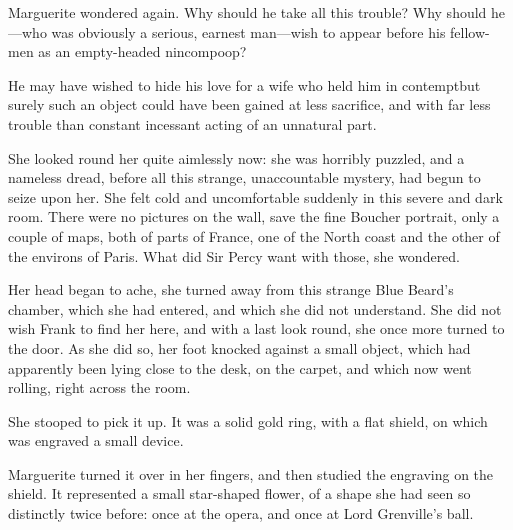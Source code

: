 Marguerite wondered again. Why should he take all this trouble? Why should he—who was obviously a serious, earnest man—wish to appear before his fellow-men as an empty-headed nincompoop?

He may have wished to hide his love for a wife who held him in contempt\textellipsis \allowbreak  but surely such an object could have been gained at less sacrifice, and with far less trouble than constant incessant acting of an unnatural part.

She looked round her quite aimlessly now: she was horribly puzzled, and a nameless dread, before all this strange, unaccountable mystery, had begun to seize upon her. She felt cold and uncomfortable suddenly in this severe and dark room. There were no pictures on the wall, save the fine Boucher portrait, only a couple of maps, both of parts of France, one of the North coast and the other of the environs of Paris. What did Sir Percy want with those, she wondered.

Her head began to ache, she turned away from this strange Blue Beard's chamber, which she had entered, and which she did not understand. She did not wish Frank to find her here, and with a last look round, she once more turned to the door. As she did so, her foot knocked against a small object, which had apparently been lying close to the desk, on the carpet, and which now went rolling, right across the room.

She stooped to pick it up. It was a solid gold ring, with a flat shield, on which was engraved a small device.

Marguerite turned it over in her fingers, and then studied the engraving on the shield. It represented a small star-shaped flower, of a shape she had seen so distinctly twice before: once at the opera, and once at Lord Grenville's ball.
